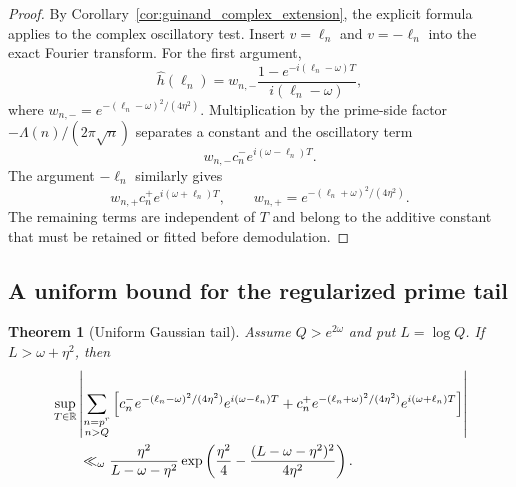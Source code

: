 \documentclass[11pt]{amsart}
\numberwithin{equation}{section}
\theoremstyle{plain}
\newtheorem{theorem}{Theorem}[section]
\theoremstyle{definition}
\theoremstyle{remark}
\newcommand{\1}{\mathbf{1}}
\begin{document}
\begin{proof}
By Corollary~\ref{cor:guinand_complex_extension}, the explicit formula
applies to the complex oscillatory test.  Insert \(v=\ell_n\) and
\(v=-\ell_n\) into the exact Fourier transform.
For the first argument,
\begin{equation}
\widehat h(\ell_n)
=
w_{n,-}
\frac{1-e^{-i(\ell_n-\omega)T}}
{i(\ell_n-\omega)},
\label{eq:branch_minus_fourier_insert}
\end{equation}
where \(w_{n,-}=e^{-(\ell_n-\omega)^2/(4\eta^2)}\).  Multiplication by the
prime-side factor \(-\Lambda(n)/(2\pi\sqrt n)\) separates a constant and
the oscillatory term
\begin{equation}
w_{n,-}c_n^-e^{i(\omega-\ell_n)T}.
\label{eq:branch_minus_oscillatory_proof}
\end{equation}
The argument \(-\ell_n\) similarly gives
\begin{equation}
w_{n,+}c_n^+e^{i(\omega+\ell_n)T},
\qquad
w_{n,+}=e^{-(\ell_n+\omega)^2/(4\eta^2)}.
\label{eq:branch_plus_oscillatory_proof}
\end{equation}
The remaining terms are independent of \(T\) and belong to the additive
constant that must be retained or fitted before demodulation.
\end{proof}

\subsection{A uniform bound for the regularized prime tail}
\label{subsec:regularized_tail_bound}

\begin{theorem}[Uniform Gaussian tail]
\label{thm:uniform_gaussian_tail}
Assume $Q>e^{2\omega}$ and put $L=\log Q$.  If
$L>\omega+\eta^2$, then
\begin{align}
&\sup_{T\in\mathbb R}
\left|
\sum_{\substack{n=p^r\\n>Q}}
\left[
 c_n^-e^{-(\ell_n-\omega)^2/(4\eta^2)}e^{i(\omega-\ell_n)T}
+c_n^+e^{-(\ell_n+\omega)^2/(4\eta^2)}e^{i(\omega+\ell_n)T}
\right]
\right|
\notag
\\
&\qquad\ll_\omega
\frac{\eta^2}{L-\omega-\eta^2}
\exp\left(
\frac{\eta^2}{4}
-
\frac{(L-\omega-\eta^2)^2}{4\eta^2}
\right).
\label{eq:uniform_gaussian_tail}
\end{align}
\end{theorem}
\end{document}
